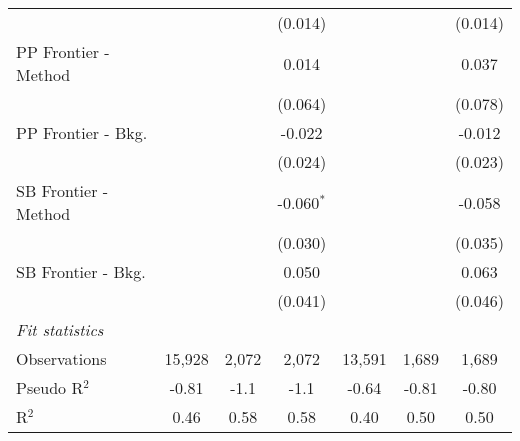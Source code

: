 \begin{tabular}{lcccccc}
                        &         &         & (0.014)      &              &         & (0.014)\\   
   PP Frontier - Method &         &         & 0.014        &              &         & 0.037\\   
                        &         &         & (0.064)      &              &         & (0.078)\\   
   PP Frontier - Bkg.   &         &         & -0.022       &              &         & -0.012\\   
                        &         &         & (0.024)      &              &         & (0.023)\\   
   SB Frontier - Method &         &         & -0.060$^{*}$ &              &         & -0.058\\   
                        &         &         & (0.030)      &              &         & (0.035)\\   
   SB Frontier - Bkg.   &         &         & 0.050        &              &         & 0.063\\   
                        &         &         & (0.041)      &              &         & (0.046)\\   
   \midrule
   \emph{Fit statistics}\\
   Observations         & 15,928  & 2,072   & 2,072        & 13,591       & 1,689   & 1,689\\  
   Pseudo R$^2$         & -0.81   & -1.1    & -1.1         & -0.64        & -0.81   & -0.80\\  
   R$^2$                & 0.46    & 0.58    & 0.58         & 0.40         & 0.50    & 0.50\\  
   

\end{tabular}
